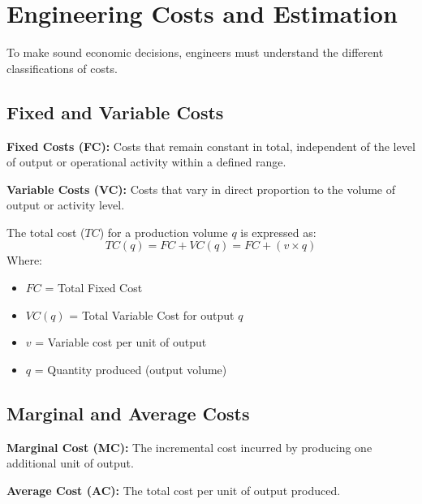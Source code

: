 \documentclass[12pt,a4paper]{article}
\begin{document}
\section{Engineering Costs and Estimation}

To make sound economic decisions, engineers must understand the different classifications of costs.

\subsection{Fixed and Variable Costs}

\begin{tcolorbox}[defbox]
\textbf{Fixed Costs (FC):} Costs that remain constant in total, independent of the level of output or operational activity within a defined range. 
\par\vspace{3pt}
\textbf{Variable Costs (VC):} Costs that vary in direct proportion to the volume of output or activity level.
\end{tcolorbox}

\begin{tcolorbox}[formulabox, title={\textbf{Total Cost Equation}}]
The total cost ($TC$) for a production volume $q$ is expressed as:
\begin{equation}
  TC(q) = FC + VC(q) = FC + (v \times q)
\end{equation}
Where:
\begin{itemize}[leftmargin=1.5em, itemsep=1pt, topsep=2pt]
  \item[] $FC$ = Total Fixed Cost
  \item[] $VC(q)$ = Total Variable Cost for output $q$
  \item[] $v$ = Variable cost per unit of output
  \item[] $q$ = Quantity produced (output volume)
\end{itemize}
\end{tcolorbox}

\subsection{Marginal and Average Costs}

\begin{tcolorbox}[defbox]
\textbf{Marginal Cost (MC):} The incremental cost incurred by producing one additional unit of output.
\par\vspace{3pt}
\textbf{Average Cost (AC):} The total cost per unit of output produced.
\end{tcolorbox}
\end{document}
